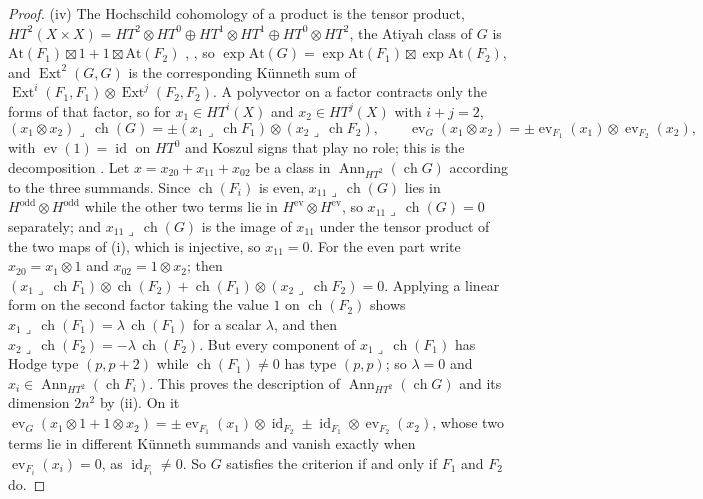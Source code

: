 \documentclass[11pt,reqno]{amsart}
\theoremstyle{plain}
\theoremstyle{definition}
\theoremstyle{remark}
\DeclareMathOperator{\ch}{ch}
\DeclareMathOperator{\Ext}{Ext}
\DeclareMathOperator{\id}{id}
\DeclareMathOperator{\Ann}{Ann}
\begin{document}
\begin{proof}
(iv) The Hochschild cohomology of a product is the tensor product,
$HT^{2}(X\times X)=HT^{2}\otimes HT^{0}\oplus HT^{1}\otimes HT^{1}\oplus
HT^{0}\otimes HT^{2}$, the Atiyah class of $G$ is
$\mathrm{At}(F_{1})\boxtimes1+1\boxtimes\mathrm{At}(F_{2})$ \cite[Proposition 3.14]{BF03},
\cite[(8.4.1)]{Mar25a}, so $\exp\mathrm{At}(G)=\exp\mathrm{At}(F_{1})\boxtimes
\exp\mathrm{At}(F_{2})$, and $\Ext^{2}(G,G)$ is the corresponding K\"unneth
sum of $\Ext^{i}(F_{1},F_{1})\otimes\Ext^{j}(F_{2},F_{2})$. A polyvector on a
factor contracts only the forms of that factor, so for $x_{1}\in HT^{i}(X)$
and $x_{2}\in HT^{j}(X)$ with $i+j=2$,
\[
  (x_{1}\otimes x_{2})\lrcorner\,\ch(G)=\pm(x_{1}\lrcorner\,\ch F_{1})\otimes
  (x_{2}\lrcorner\,\ch F_{2}),\qquad
  \operatorname{ev}_{G}(x_{1}\otimes x_{2})=\pm\operatorname{ev}_{F_{1}}(x_{1})
  \otimes\operatorname{ev}_{F_{2}}(x_{2}),
\]
with $\operatorname{ev}(1)=\id$ on $HT^{0}$ and Koszul signs that play no
role; this is the decomposition \cite[(8.4.2), (8.4.3)]{Mar25a}. Let
$x=x_{20}+x_{11}+x_{02}$ be a class in $\Ann_{HT^{2}}(\ch G)$ according to the
three summands. Since $\ch(F_{i})$ is even, $x_{11}\lrcorner\,\ch(G)$ lies in
$H^{\mathrm{odd}}\otimes H^{\mathrm{odd}}$ while the other two terms lie in
$H^{\mathrm{ev}}\otimes H^{\mathrm{ev}}$, so $x_{11}\lrcorner\,\ch(G)=0$
separately; and $x_{11}\lrcorner\,\ch(G)$ is the image of $x_{11}$ under the
tensor product of the two maps of (i), which is injective, so $x_{11}=0$. For
the even part write $x_{20}=x_{1}\otimes1$ and $x_{02}=1\otimes x_{2}$; then
$(x_{1}\lrcorner\,\ch F_{1})\otimes\ch(F_{2})+\ch(F_{1})\otimes(x_{2}\lrcorner\,\ch F_{2})=0$.
Applying a linear form on the second factor taking the value $1$ on
$\ch(F_{2})$ shows $x_{1}\lrcorner\,\ch(F_{1})=\lambda\,\ch(F_{1})$ for a
scalar $\lambda$, and then $x_{2}\lrcorner\,\ch(F_{2})=-\lambda\,\ch(F_{2})$.
But every component of $x_{1}\lrcorner\,\ch(F_{1})$ has Hodge type $(p,p+2)$
while $\ch(F_{1})\ne0$ has type $(p,p)$; so $\lambda=0$ and
$x_{i}\in\Ann_{HT^{2}}(\ch F_{i})$. This proves the description of
$\Ann_{HT^{2}}(\ch G)$ and its dimension $2n^{2}$ by (ii). On it
$\operatorname{ev}_{G}(x_{1}\otimes1+1\otimes x_{2})=\pm\operatorname{ev}_{F_{1}}(x_{1})
\otimes\id_{F_{2}}\pm\id_{F_{1}}\otimes\operatorname{ev}_{F_{2}}(x_{2})$, whose
two terms lie in different K\"unneth summands and vanish exactly when
$\operatorname{ev}_{F_{i}}(x_{i})=0$, as $\id_{F_{i}}\ne0$. So $G$ satisfies
the criterion if and only if $F_{1}$ and $F_{2}$ do.


\end{proof}
\end{document}
